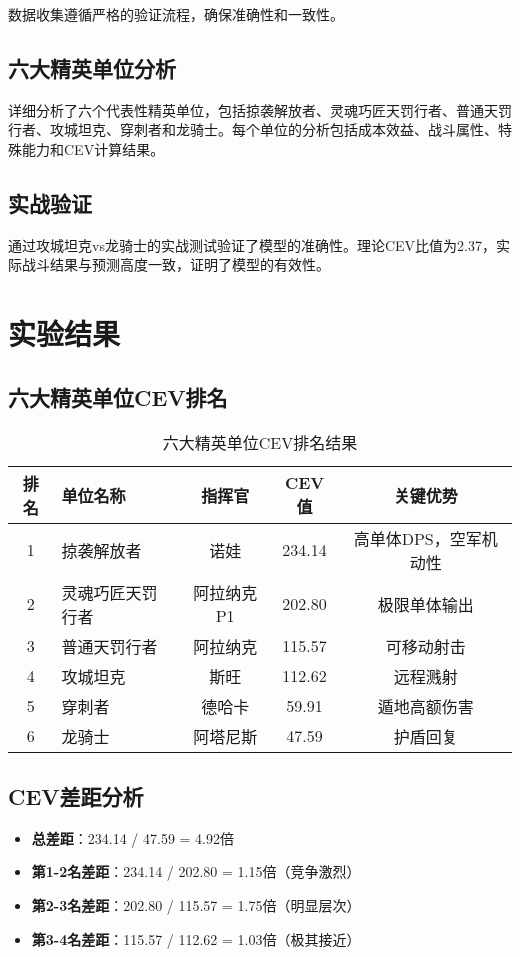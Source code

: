 \documentclass[a4paper,12pt]{article}
\begin{document}
数据收集遵循严格的验证流程，确保准确性和一致性。

\subsection{六大精英单位分析}

详细分析了六个代表性精英单位，包括掠袭解放者、灵魂巧匠天罚行者、普通天罚行者、攻城坦克、穿刺者和龙骑士。每个单位的分析包括成本效益、战斗属性、特殊能力和CEV计算结果。

\subsection{实战验证}

通过攻城坦克vs龙骑士的实战测试验证了模型的准确性。理论CEV比值为2.37，实际战斗结果与预测高度一致，证明了模型的有效性。

\section{实验结果}

\subsection{六大精英单位CEV排名}

\begin{table}[htbp]
\centering
\caption{六大精英单位CEV排名结果}
\begin{tabular}{@{}clccc@{}}
\toprule
排名 & 单位名称 & 指挥官 & CEV值 & 关键优势 \\
\midrule
1 & 掠袭解放者 & 诺娃 & 234.14 & 高单体DPS，空军机动性 \\
2 & 灵魂巧匠天罚行者 & 阿拉纳克P1 & 202.80 & 极限单体输出 \\
3 & 普通天罚行者 & 阿拉纳克 & 115.57 & 可移动射击 \\
4 & 攻城坦克 & 斯旺 & 112.62 & 远程溅射 \\
5 & 穿刺者 & 德哈卡 & 59.91 & 遁地高额伤害 \\
6 & 龙骑士 & 阿塔尼斯 & 47.59 & 护盾回复 \\
\bottomrule
\end{tabular}
\end{table}

\subsection{CEV差距分析}

\begin{itemize}
    \item \textbf{总差距}：234.14 / 47.59 = 4.92倍
    \item \textbf{第1-2名差距}：234.14 / 202.80 = 1.15倍（竞争激烈）
    \item \textbf{第2-3名差距}：202.80 / 115.57 = 1.75倍（明显层次）
    \item \textbf{第3-4名差距}：115.57 / 112.62 = 1.03倍（极其接近）
\end{itemize}
\end{document}

